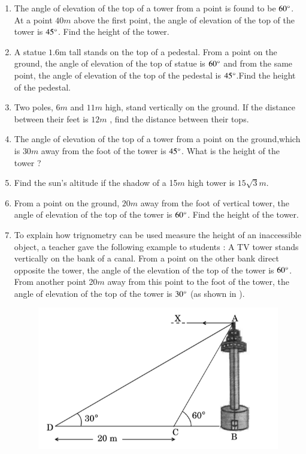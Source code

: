 \begin{enumerate}[label=\thesubsection.\arabic*.,ref=\thesubsection.\theenumi]
%
    \hfill{}\item The angle of elevation of the top of a tower from a point is found to be $60\degree$. At a point $40m$ above the first point, the angle of elevation of the top of the tower is $45\degree$. Find the height of the tower. 
    \hfill{}\item A statue $1.6$m tall stands on the top of a pedestal. From a point on the ground, the angle of elevation of the top of statue is $60\degree$ and from the same point, the angle of elevation of the top of the pedestal is $45\degree$.Find the height of the pedestal.
    \hfill{}\item Two poles, $6m$ and $11m$ high, stand vertically on the ground. If the distance between their feet is $12m$ , find the distance between their tops.
%
	\hfill{}\item The angle of elevation of the top of a tower from a point on the ground,which is $30m$ away from the foot of the tower is $45\degree$. What is the height of the tower ?
	\hfill{}\item Find the sun's altitude if the shadow of a 15$m$ high tower is ${15}\sqrt{3}m$.
	\hfill{}\item From a point on the ground, $20m$ away from the foot of vertical tower, the angle of elevation of the top of the tower is $60\degree$. Find the height of the tower.
			\hfill{}
\item To explain how trignometry can be used measure the height of an inaccessible object, a teacher gave the following example to students :
%
		A TV tower stands vertically on the bank of a canal.  From a point on the other bank direct opposite the tower, the angle of the elevation of the top of the tower is $60\degree$. From another point 20$m$ away from this point to the foot of the tower, the angle of elevation of the top of the tower is $30\degree$ (as shown in 
). 
%
		\begin{figure}[H]
			\includegraphics[width=0.75\columnwidth]{cbse/figs/Problem.png}

\end{figure}
\end{enumerate}

